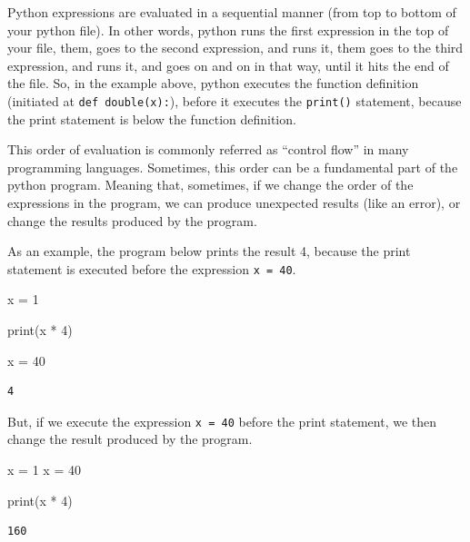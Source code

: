 \documentclass[
  11pt,
  letterpaper,
  DIV=11,
  numbers=noendperiod]{scrreprt}
\newenvironment{Shaded}{\begin{snugshade}}{\end{snugshade}}
\newcommand{\BuiltInTok}[1]{\textcolor[rgb]{0.00,0.23,0.31}{#1}}
\newcommand{\DecValTok}[1]{\textcolor[rgb]{0.68,0.00,0.00}{#1}}
\newcommand{\NormalTok}[1]{\textcolor[rgb]{0.00,0.23,0.31}{#1}}
\newcommand{\OperatorTok}[1]{\textcolor[rgb]{0.37,0.37,0.37}{#1}}
\begin{document}
Python expressions are evaluated in a sequential manner (from top to
bottom of your python file). In other words, python runs the first
expression in the top of your file, them, goes to the second expression,
and runs it, them goes to the third expression, and runs it, and goes on
and on in that way, until it hits the end of the file. So, in the
example above, python executes the function definition (initiated at
\texttt{def\ double(x):}), before it executes the \texttt{print()}
statement, because the print statement is below the function definition.

This order of evaluation is commonly referred as ``control flow'' in
many programming languages. Sometimes, this order can be a fundamental
part of the python program. Meaning that, sometimes, if we change the
order of the expressions in the program, we can produce unexpected
results (like an error), or change the results produced by the program.

As an example, the program below prints the result 4, because the print
statement is executed before the expression \texttt{x\ =\ 40}.

\begin{Shaded}
\begin{Highlighting}[]
\NormalTok{x }\OperatorTok{=} \DecValTok{1}

\BuiltInTok{print}\NormalTok{(x }\OperatorTok{*} \DecValTok{4}\NormalTok{)}

\NormalTok{x }\OperatorTok{=} \DecValTok{40}
\end{Highlighting}
\end{Shaded}

\begin{verbatim}
4
\end{verbatim}

But, if we execute the expression \texttt{x\ =\ 40} before the print
statement, we then change the result produced by the program.

\begin{Shaded}
\begin{Highlighting}[]
\NormalTok{x }\OperatorTok{=} \DecValTok{1}
\NormalTok{x }\OperatorTok{=} \DecValTok{40}

\BuiltInTok{print}\NormalTok{(x }\OperatorTok{*} \DecValTok{4}\NormalTok{)}
\end{Highlighting}
\end{Shaded}

\begin{verbatim}
160
\end{verbatim}
\end{document}
